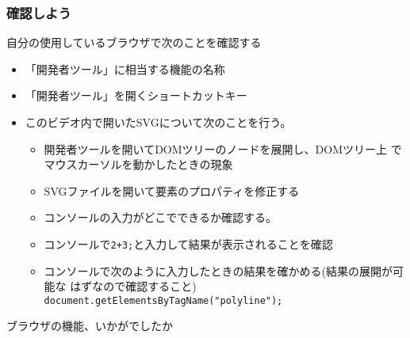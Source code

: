 \begin{frame}[containsverbatim]
 \frametitle{確認しよう}
 自分の使用しているブラウザで次のことを確認する
 \begin{itemize}
  \item 「開発者ツール」に相当する機能の名称
  \item 「開発者ツール」を開くショートカットキー
  \item このビデオ内で開いたSVGについて次のことを行う。
\begin{itemize}
 \item 開発者ツールを開いてDOMツリーのノードを展開し、DOMツリー上
        でマウスカーソルを動かしたときの現象
  \item SVGファイルを開いて要素のプロパティを修正する
  \item コンソールの入力がどこでできるか確認する。
  \item コンソールで\texttt{2+3;}と入力して結果が表示されることを確認
  \item コンソールで次のように入力したときの結果を確かめる(結果の展開が可能な
        はずなので確認すること)
\\
        \texttt{document.getElementsByTagName("polyline");}
\end{itemize}        
 \end{itemize}
 ブラウザの機能、いかがでしたか
 \end{frame}

\begin{frame}[containsverbatim]
 \frametitle{}
\end{frame}
